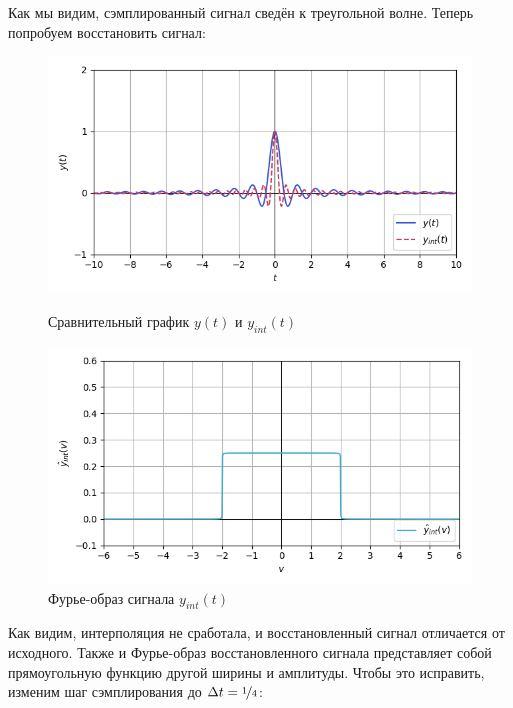\documentclass[a4paper]{article}
\begin{document}
Как мы видим, сэмплированный сигнал сведён к треугольной волне. Теперь попробуем восстановить сигнал:
\begin{figure}[H]
    \begin{minipage}{0.49\textwidth}
        \centering \includegraphics[width=\textwidth]{sources/second/sinc dt=0.5 B=2/5_y_cmp(interpolation).png}
        \caption{Сравнительный график $y(t)$ и $y_{int}(t)$}
    \end{minipage}\hfill
    \begin{minipage}{0.49\textwidth}
        \centering \includegraphics[width=\textwidth]{sources/second/sinc dt=0.5 B=2/7_interp_image.png}
        \caption{Фурье-образ сигнала $y_{int}(t)$}
    \end{minipage}
\end{figure}
Как видим, интерполяция не сработала, и восстановленный сигнал отличается от исходного. Также и Фурье-образ восстановленного сигнала представляет собой прямоугольную функцию другой ширины и амплитуды. Чтобы это исправить, изменим шаг сэмплирования до $\Delta t = \nicefrac{1}{4}$:
\end{document}
